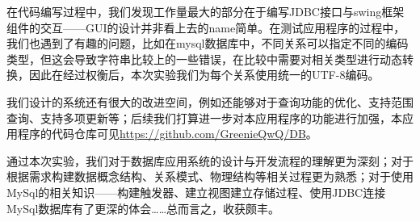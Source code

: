 \documentclass[withoutpreface,bwprint]{cumcmthesis} %
\begin{document}
在代码编写过程中，我们发现工作量最大的部分在于编写JDBC接口与swing框架组件的交互——GUI的设计并非看上去的name简单。在测试应用程序的过程中，我们也遇到了有趣的问题，比如在mysql数据库中，不同关系可以指定不同的编码类型，但这会导致字符串比较上的一些错误，在比较中需要对相关类型进行动态转换，因此在经过权衡后，本次实验我们为每个关系使用统一的UTF-8编码。
 
我们设计的系统还有很大的改进空间，例如还能够对于查询功能的优化、支持范围查询、支持多项更新等；后续我们打算进一步对本应用程序的功能进行加强，本应用程序的代码仓库可见\url{https://github.com/GreenieQwQ/DB}。


通过本次实验，我们对于数据库应用系统的设计与开发流程的理解更为深刻；对于根据需求构建数据概念结构、关系模式、物理结构等相关过程更为熟悉；对于使用MySql的相关知识——构建触发器、建立视图建立存储过程、使用JDBC连接MySql数据库有了更深的体会……总而言之，收获颇丰。




\end{document}
